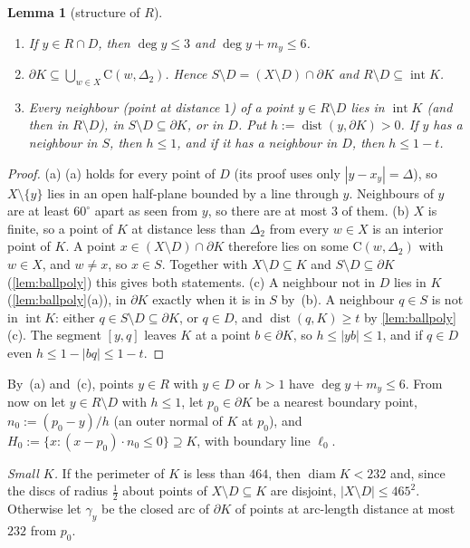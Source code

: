 \documentclass[11pt]{amsart}
\newtheorem{lemma}[theorem]{Lemma}
\theoremstyle{definition}
\theoremstyle{remark}
\newcommand{\Dt}{\Delta_2}
\newcommand{\dist}{\operatorname{dist}}
\newcommand{\Cc}{\mathrm{C}}      %
\begin{document}
\begin{lemma}[structure of $R$]\label{lem:Rstructure}
\begin{enumerate}[label=(\alph*)]
\item If $y\in R\cap D$, then $\deg y\le3$ and $\deg y+m_y\le6$.
\item $\partial K\subseteq\bigcup_{w\in X}\Cc(w,\Dt)$. Hence $S\setminus D=(X\setminus D)\cap\partial K$ and $R\setminus D\subseteq\operatorname{int}K$.
\item Every neighbour (point at distance $1$) of a point $y\in R\setminus D$ lies in $\operatorname{int}K$ (and then in $R\setminus D$), in $S\setminus D\subseteq\partial K$, or in $D$. Put $h:=\dist(y,\partial K)>0$. If $y$ has a neighbour in $S$, then $h\le1$, and if it has a neighbour in $D$, then $h\le1-t$.
\end{enumerate}
\end{lemma}
\begin{proof}
(a) (a) holds for every point of $D$ (its proof uses only $|y-x_y|=\Delta$), so $X\setminus\{y\}$ lies in an open half-plane bounded by a line through $y$. Neighbours of $y$ are at least $60^\circ$ apart as seen from $y$, so there are at most $3$ of them.
(b) $X$ is finite, so a point of $K$ at distance less than $\Dt$ from every $w\in X$ is an interior point of $K$. A point $x\in(X\setminus D)\cap\partial K$ therefore lies on some $\Cc(w,\Dt)$ with $w\in X$, and $w\ne x$, so $x\in S$. Together with $X\setminus D\subseteq K$ and $S\setminus D\subseteq\partial K$ (\cref{lem:ballpoly}) this gives both statements.
(c) A neighbour not in $D$ lies in $K$ (\cref{lem:ballpoly}(a)), in $\partial K$ exactly when it is in $S$ by~(b). A neighbour $q\in S$ is not in $\operatorname{int}K$: either $q\in S\setminus D\subseteq\partial K$, or $q\in D$, and $\dist(q,K)\ge t$ by \cref{lem:ballpoly}(c). The segment $[y,q]$ leaves $K$ at a point $b\in\partial K$, so $h\le|yb|\le1$, and if $q\in D$ even $h\le1-|bq|\le1-t$.
\end{proof}

By~(a) and~(c), points $y\in R$ with $y\in D$ or $h>1$ have $\deg y+m_y\le6$. From now on let $y\in R\setminus D$ with $h\le1$, let $p_0\in\partial K$ be a nearest boundary point, $n_0:=(p_0-y)/h$ (an outer normal of $K$ at $p_0$), and $H_0:=\{x:(x-p_0)\cdot n_0\le0\}\supseteq K$, with boundary line $\ell_0$.

\emph{Small $K$.} If the perimeter of $K$ is less than $464$, then $\operatorname{diam}K<232$ and, since the discs of radius $\frac12$ about points of $X\setminus D\subseteq K$ are disjoint, $|X\setminus D|\le465^2$. Otherwise let $\gamma_y$ be the closed arc of $\partial K$ of points at arc-length distance at most $232$ from $p_0$.
\end{document}
